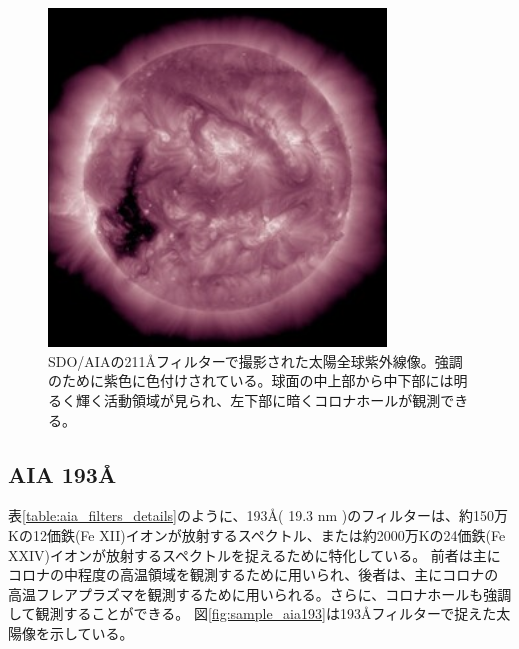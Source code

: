     \begin{figure}[h]
        \centering
        \includegraphics[width=0.8\textwidth]{figures/latest_256_0211.jpg}
        \caption{SDO/AIAの211Åフィルターで撮影された太陽全球紫外線像。強調のために紫色に色付けされている。球面の中上部から中下部には明るく輝く活動領域が見られ、左下部に暗くコロナホールが観測できる。}
        \label{fig:sample_aia211}
    \end{figure}

\subsection{AIA 193Å}
    表\ref{table:aia_filters_details}のように、193Å( 19.3 nm )のフィルターは、約150万Kの12価鉄(Fe XII)イオンが放射するスペクトル、または約2000万Kの24価鉄(Fe XXIV)イオンが放射するスペクトルを捉えるために特化している。
    前者は主にコロナの中程度の高温領域を観測するために用いられ、後者は、主にコロナの高温フレアプラズマを観測するために用いられる。さらに、コロナホールも強調して観測することができる。
    図\ref{fig:sample_aia193}は193Åフィルターで捉えた太陽像を示している。
    
